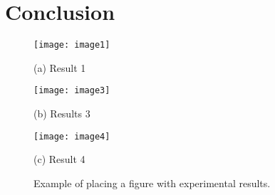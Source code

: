 \documentclass{article}
\begin{document}
\section{Conclusion}
\label{sec:conclusion}



\begin{figure}[htb]

\begin{minipage}[b]{1.0\linewidth}
  \centering
  \centerline{\texttt{[image: image1]}}
  \centerline{(a) Result 1}\medskip
\end{minipage}
%
\begin{minipage}[b]{.48\linewidth}
  \centering
  \centerline{\texttt{[image: image3]}}
  \centerline{(b) Results 3}\medskip
\end{minipage}
\hfill
\begin{minipage}[b]{0.48\linewidth}
  \centering
  \centerline{\texttt{[image: image4]}}
  \centerline{(c) Result 4}\medskip
\end{minipage}
%
\caption{Example of placing a figure with experimental results.}
\label{fig:res}
%
\end{figure}




\vfill\pagebreak




\end{document}
